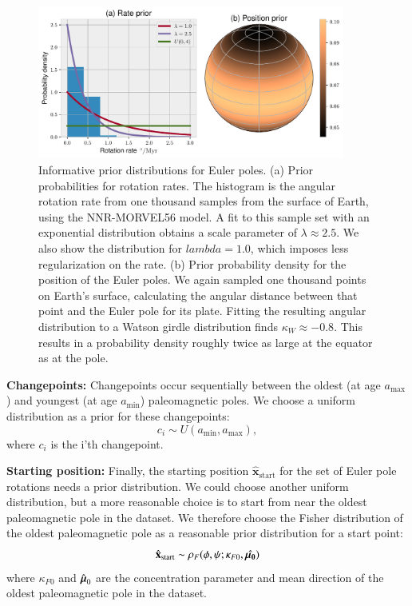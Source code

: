 \documentclass[preprint,12pt,authoryear]{elsarticle}
\newcommand{\mitbf}[1]{\hbox{\mathversion{bold}$#1$}}
\begin{document}
\begin{figure}
\includegraphics[width=0.9\textwidth]{figures/euler_pole_prior/euler_pole_prior.pdf}
\caption[Informative prior distributions for Euler poles]{Informative prior distributions for Euler poles. (a) Prior probabilities for rotation rates. The histogram is the angular rotation rate from one thousand samples from the surface of Earth, using the NNR-MORVEL56 model. A fit to this sample set with an exponential distribution obtains a scale parameter of $\lambda \approx 2.5$. We also show the distribution for $lambda = 1.0$, which imposes less regularization on the rate. (b) Prior probability density for the position of the Euler poles. We again sampled one thousand points on Earth's surface, calculating the angular distance between that point and the Euler pole for its plate. Fitting the resulting angular distribution to a Watson girdle distribution finds $\kappa_W \approx -0.8$. This results in a probability density roughly twice as large at the equator as at the pole.}
\label{fig:euler_pole_prior}
\end{figure}

\textbf{Changepoints:} 
Changepoints occur sequentially between the oldest (at age $a_\mathrm{max}$) and
youngest (at age $a_\mathrm{min}$) paleomagnetic poles.
We choose a uniform distribution as a prior for these changepoints:
\begin{equation}
c_i \sim U( a_\mathrm{min}, a_\mathrm{max}),
\end{equation}
where $c_i$ is the i'th changepoint.

\textbf{Starting position:}
Finally, the starting position $\hat{\mathbf{x}}_\mathrm{start}$ for the set of Euler pole rotations needs a prior distribution.
We could choose another uniform distribution, but a more reasonable choice
is to start from near the oldest paleomagnetic pole in the dataset.
We therefore choose the Fisher distribution of the oldest paleomagnetic pole as a reasonable prior distribution for a start point:
\begin{equation}
\hat{\mathbf{x}}_\mathrm{start} \sim \rho_F(\phi, \psi; \kappa_{F0}, \hat{\mitbf{\mu_0}})
\end{equation}
where $\kappa_{F0}$ and $\hat{\mitbf{\mu}}_0$ are the concentration parameter and mean direction
of the oldest paleomagnetic pole in the dataset.
\end{document}
